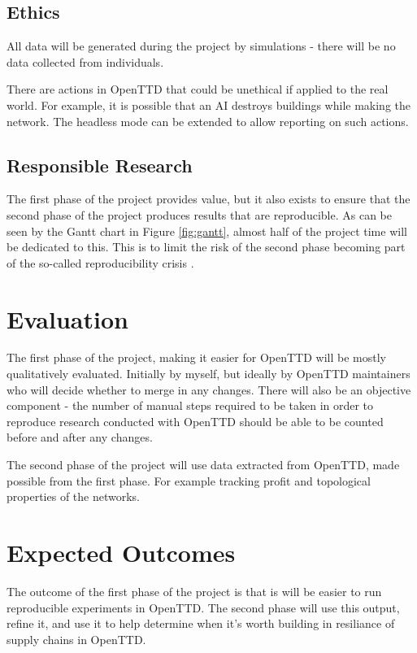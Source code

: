 \documentclass[a4paper,11pt]{article}
\begin{document}
\subsection{Ethics}

All data will be generated during the project by simulations - there will be no data collected from individuals.

There are actions in OpenTTD that could be unethical if applied to the real world. For example, it is possible that an AI destroys buildings while making the network. The headless mode can be extended to allow reporting on such actions.

\subsection{Responsible Research}

The first phase of the project provides value, but it also exists to ensure that the second phase of the project produces results that are reproducible. As can be seen by the Gantt chart in Figure \ref{fig:gantt}, almost half of the project time will be dedicated to this. This is to limit the risk of the second phase becoming part of the so-called reproducibility crisis \cite{baker_1500_2016}.

\section{Evaluation}

The first phase of the project, making it easier for OpenTTD will be mostly qualitatively evaluated. Initially by myself, but ideally by OpenTTD maintainers who will decide whether to merge in any changes. There will also be an objective component - the number of manual steps required to be taken in order to reproduce research conducted with OpenTTD should be able to be counted before and after any changes.

The second phase of the project will use data extracted from OpenTTD, made possible from the first phase. For example tracking profit and topological properties of the networks.

\section{Expected Outcomes}

The outcome of the first phase of the project is that is will be easier to run reproducible experiments in OpenTTD. The second phase will use this output, refine it, and use it to help determine when it's worth building in resiliance of supply chains in OpenTTD.
\end{document}

